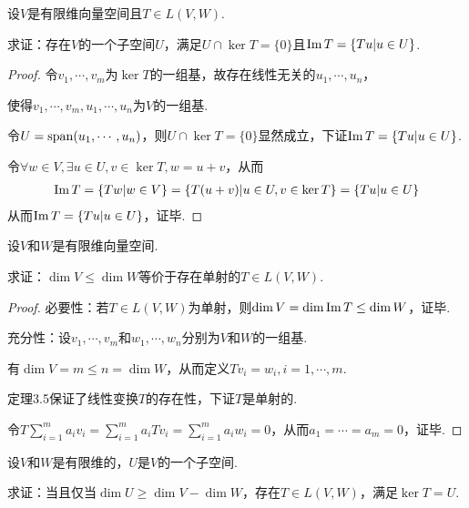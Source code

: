\begin{problem}[12]\label{3.B.12}
    设\(V\)是有限维向量空间且\(T\in L(V,W)\).

    求证：存在\(V\)的一个子空间\(U\)，满足\(U \cap \ker T=\{0\}\)且\(\operatorname{Im} T=\{Tu|u\in U\}\).    
\end{problem}

\begin{proof}
    令\(v_1,\cdots,v_m\)为\(\ker T\)的一组基，故存在线性无关的\(u_1,\cdots,u_n\)，

    使得\(v_1,\cdots,v_m,u_1,\cdots,u_n\)为\(V\)的一组基.
    
    令\(U=\operatorname{span} (u_1,\cdots,u_n)\)，则\(U\cap \ker T=\{0\}\)显然成立，下证\(\operatorname{Im} T=\{Tu|u\in U\}\).
    
    令\(\forall w\in V,\exists u\in U,v\in \ker T, w=u+v\)，从而
    \begin{align*}
        \operatorname{Im} T=\{Tw|w\in V\}=\{T(u+v)|u\in U,v\in \ker T\}=\{Tu|u\in U\}
    \end{align*}
    从而\(\operatorname{Im} T=\{Tu|u\in U\}\)，证毕.    
\end{proof}

\newpage

\begin{problem}[17]\label{3.B.17}
    设\(V\)和\(W\)是有限维向量空间.
    
    求证：\(\dim V \leq \dim W\)等价于存在单射的\(T\in L(V,W)\).
\end{problem}

\begin{proof}
    必要性：若\(T\in L(V,W)\)为单射，则\(\dim V=\dim \operatorname{Im} T \leq \dim W\)，证毕.
    
    充分性：设\(v_1,\cdots,v_m\)和\(w_1,\cdots,w_n\)分别为\(V\)和\(W\)的一组基.
    
    有\(\dim V=m\leq n=\dim W\)，从而定义\(Tv_i=w_i,i=1,\cdots,m\).
    
    定理3.5保证了线性变换\(T\)的存在性，下证\(T\)是单射的.
    
    令\(T\sum_{i=1}^m a_iv_i=\sum_{i=1}^m a_iTv_i=\sum_{i=1}^m a_iw_i=0\)，从而\(a_1=\cdots=a_m=0\)，证毕.    
\end{proof}

\begin{problem}[19]\label{3.B.19}
    设\(V\)和\(W\)是有限维的，\(U\)是\(V\)的一个子空间.

    求证：当且仅当\(\dim U \geq \dim V-\dim W\)，存在\(T\in L(V,W)\)，满足\(\ker T=U\).
\end{problem}

